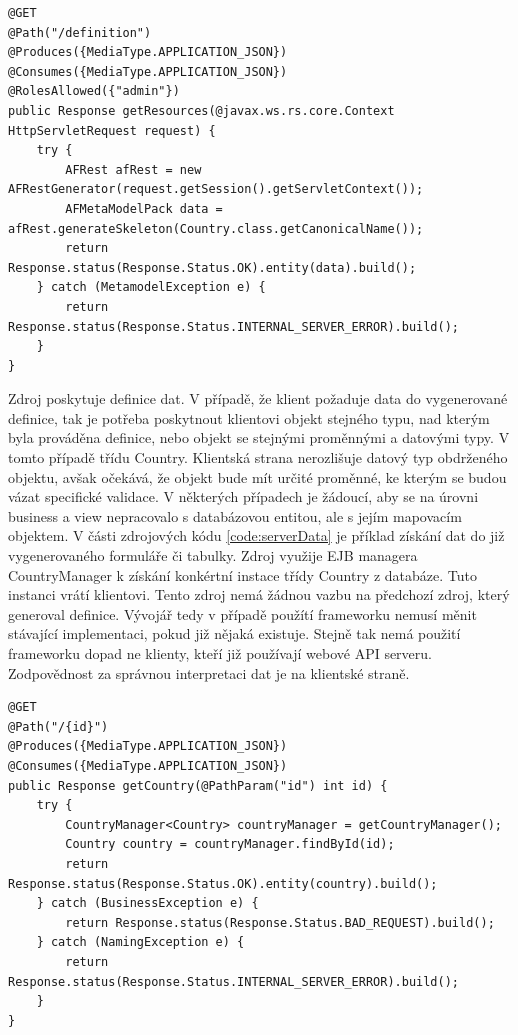 \begin{lstlisting}[caption={Ukázka zdroje, sloužícího k vygenerování definice třídy Country},
  label={code:serverDefinition}]
@GET
@Path("/definition")
@Produces({MediaType.APPLICATION_JSON})
@Consumes({MediaType.APPLICATION_JSON})
@RolesAllowed({"admin"})
public Response getResources(@javax.ws.rs.core.Context HttpServletRequest request) {
	try {
		AFRest afRest = new AFRestGenerator(request.getSession().getServletContext());
		AFMetaModelPack data = afRest.generateSkeleton(Country.class.getCanonicalName());
		return Response.status(Response.Status.OK).entity(data).build();
	} catch (MetamodelException e) {
		return Response.status(Response.Status.INTERNAL_SERVER_ERROR).build();
	}
}
\end{lstlisting}
Zdroj poskytuje definice dat. V případě, že klient požaduje data do vygenerované definice, tak je potřeba poskytnout klientovi objekt stejného typu, nad kterým byla prováděna definice, nebo objekt se stejnými proměnnými a datovými typy. V tomto případě třídu Country. Klientská strana nerozlišuje datový typ obdrženého objektu, avšak očekává, že objekt bude mít určité proměnné, ke kterým se budou vázat specifické validace. V některých případech je žádoucí, aby se na úrovni business a view nepracovalo s databázovou entitou, ale s jejím mapovacím objektem. V části zdrojových kódu \ref{code:serverData} je příklad získání dat do již vygenerovaného formuláře či tabulky. Zdroj využije EJB managera CountryManager k získání konkértní instace třídy Country z databáze. Tuto instanci vrátí klientovi. Tento zdroj nemá žádnou vazbu na předchozí zdroj, který generoval definice. Vývojář tedy v případě použítí frameworku nemusí měnit stávající implementaci, pokud již nějaká existuje. Stejně tak nemá použití frameworku dopad ne klienty, kteří již používají webové API serveru. Zodpovědnost za správnou interpretaci dat je na klientské straně.
\begin{lstlisting}[caption=Zdroj poskytující konrétní instanci třídy Country,
  label={code:serverData}]
@GET
@Path("/{id}")
@Produces({MediaType.APPLICATION_JSON})
@Consumes({MediaType.APPLICATION_JSON})
public Response getCountry(@PathParam("id") int id) {
	try {
		CountryManager<Country> countryManager = getCountryManager();
		Country country = countryManager.findById(id);
		return Response.status(Response.Status.OK).entity(country).build();
	} catch (BusinessException e) {
		return Response.status(Response.Status.BAD_REQUEST).build();
	} catch (NamingException e) {
		return Response.status(Response.Status.INTERNAL_SERVER_ERROR).build();
	}
}
\end{lstlisting}

